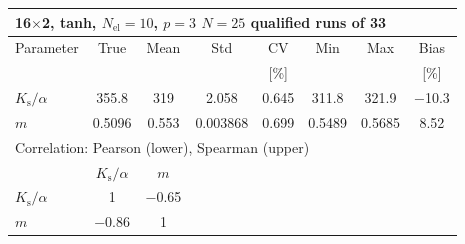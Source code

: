 \begin{tabular}{lccccccc}
\toprule
\multicolumn{8}{l}{16$\times$2, tanh, $N_{\mathrm{el}}=10$, $p=3$ \quad $N=25$ qualified runs of 33} \\
\midrule
Parameter & True & Mean & Std & CV & Min & Max & Bias \\
 &  &  &  & [\%] &  &  & [\%] \\
\midrule
  $K_{\mathrm{s}}/\alpha$ & \num{355.8} & \num{319} & \num{2.058} & \num{0.645} & \num{311.8} & \num{321.9} & \num[retain-explicit-plus]{-10.3} \\
  $m$ & \num{0.5096} & \num{0.553} & \num{0.003868} & \num{0.699} & \num{0.5489} & \num{0.5685} & \num[retain-explicit-plus]{+8.52} \\
\midrule
\multicolumn{8}{l}{Correlation: Pearson (lower), Spearman (upper)} \\
 & $K_{\mathrm{s}}/\alpha$ & $m$ &  &  &  &  &  \\
  $K_{\mathrm{s}}/\alpha$ & 1 & \num{-0.65} &  &  &  &  &  \\
  $m$ & \num{-0.86} & 1 &  &  &  &  &  \\
\bottomrule
\end{tabular}
